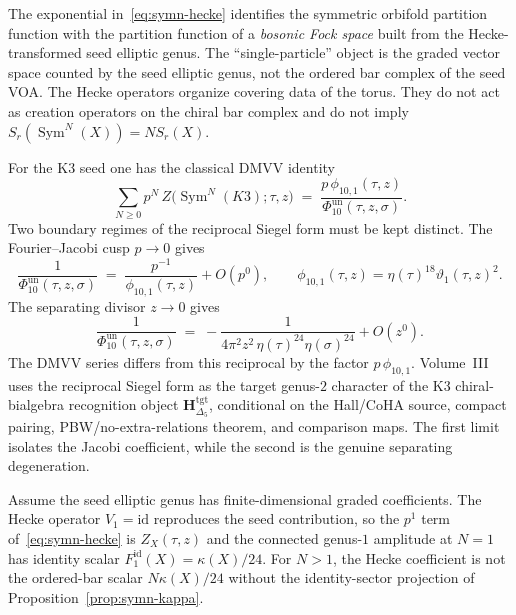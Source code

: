 \begin{remark}
\label{rem:symn-fock}
The exponential in~\eqref{eq:symn-hecke} identifies the
symmetric orbifold partition function with the partition
function of a \emph{bosonic Fock space} built from the
Hecke-transformed seed elliptic genus. The ``single-particle''
object is the graded vector space counted by the seed elliptic
genus, not the ordered bar complex of the seed VOA. The Hecke
operators organize covering data of the torus. They do not act as
creation operators on the chiral bar complex and do not imply
$S_r(\operatorname{Sym}^N(X))=N S_r(X)$.
\end{remark}

\begin{remark}
\label{rem:symn-k3-igusa-character}
For the K3 seed one has the classical DMVV identity
\[
 \sum_{N\geq 0} p^N\,Z\bigl(\operatorname{Sym}^N(K3);\tau,z\bigr)
 \;=\;
 \frac{p\,\phi_{10,1}(\tau,z)}
      {\Phi_{10}^{\mathrm{un}}(\tau,z,\sigma)}.
\]
Two boundary regimes of the reciprocal Siegel form must be kept
distinct. The Fourier--Jacobi cusp $p\to 0$ gives
\[
 \frac{1}{\Phi_{10}^{\mathrm{un}}(\tau,z,\sigma)}
 \;=\;
 \frac{p^{-1}}{\phi_{10,1}(\tau,z)} + O(p^0),
 \qquad
 \phi_{10,1}(\tau,z)=\eta(\tau)^{18}\vartheta_1(\tau,z)^2.
\]
The separating divisor $z\to 0$ gives
\[
 \frac{1}{\Phi_{10}^{\mathrm{un}}(\tau,z,\sigma)}
 \;=\;
 -\frac{1}{4\pi^2 z^2\,\eta(\tau)^{24}\eta(\sigma)^{24}} + O(z^0).
\]
The DMVV series differs from this reciprocal by the factor
$p\,\phi_{10,1}$. Volume~III uses the reciprocal Siegel form as the
target genus-$2$ character of the K3 chiral-bialgebra recognition
object $\mathbf{H}_{\Delta_5}^{\mathrm{tgt}}$, conditional on the
Hall/CoHA source, compact pairing, PBW/no-extra-relations theorem,
and comparison maps. The first limit isolates the Jacobi coefficient,
while the second is the genuine separating degeneration.
\end{remark}

\begin{proposition}\label{prop:symn-hecke-kappa}
Assume the seed elliptic genus has finite-dimensional graded
coefficients. The Hecke operator $V_1 = \mathrm{id}$ reproduces the
seed contribution, so the $p^1$ term of~\eqref{eq:symn-hecke}
is $Z_X(\tau, z)$ and the connected genus-$1$ amplitude at
$N = 1$ has identity scalar $F^{\mathrm{id}}_1(X)=\kappa(X)/24$.
For $N>1$, the Hecke coefficient is not the ordered-bar scalar
$N\kappa(X)/24$ without the identity-sector projection of
Proposition~\ref{prop:symn-kappa}.
\end{proposition}

